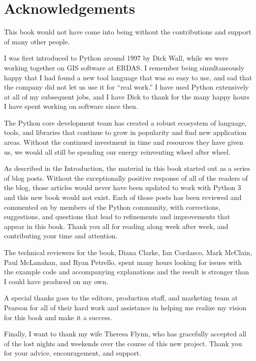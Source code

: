 \cleardoublepage
\chapter*{Acknowledgements}

\noindent This book would not have come into being without the contributions and
support of many other people.

I was first introduced to Python around 1997 by Dick Wall, while we
were working together on GIS software at ERDAS. I remember being
simultaneously happy that I had found a new tool language that was so
easy to use, and sad that the company did not let us use it for ``real
work.'' I have used Python extensively at all of my subsequent jobs,
and I have Dick to thank for the many happy hours I have spent working
on software since then.

The Python core development team has created a robust ecosystem of
language, tools, and libraries that continue to grow in popularity and
find new application areas. Without the continued investment in time
and resources they have given us, we would all still be spending our
energy reinventing wheel after wheel.

As described in the Introduction, the material in this book started
out as a series of blog posts. Without the exceptionally positive
response of all of the readers of the blog, those articles would never
have been updated to work with Python 3 and this new book would not
exist. Each of those posts has been reviewed and commented on by
members of the Python community, with corrections, suggestions, and
questions that lead to refinements and improvements that appear in
this book. Thank you all for reading along week after week, and
contributing your time and attention.

The technical reviewers for the book, Diana Clarke, Ian Cordasco, Mark
McClain, Paul McLanahan, and Ryan Petrello, spent many hours looking
for issues with the example code and accompanying explanations and the
result is stronger than I could have produced on my own.

A special thanks goes to the editors, production staff, and marketing
team at Pearson for all of their hard work and assistance in helping
me realize my vision for this book and make it a success.

Finally, I want to thank my wife Theresa Flynn, who has gracefully
accepted all of the lost nights and weekends over the course of this
new project. Thank you for your advice, encouragement, and support.
